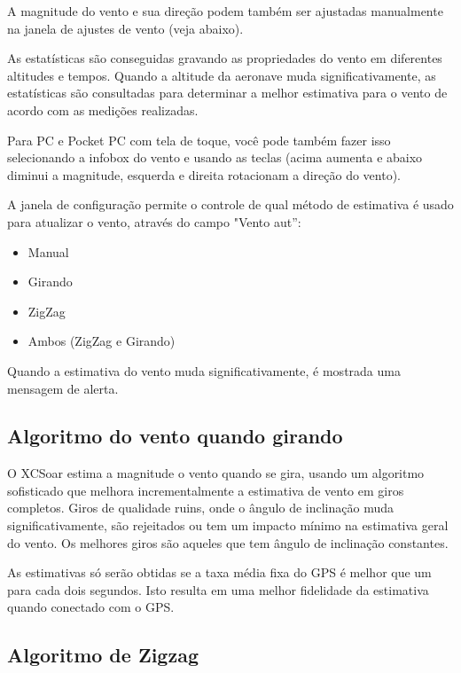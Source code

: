A magnitude do vento e sua direção podem também ser ajustadas manualmente na janela de ajustes de vento (veja abaixo).

As estatísticas são conseguidas gravando as propriedades do vento em diferentes altitudes e tempos.  Quando a altitude da aeronave muda significativamente, as estatísticas são consultadas para determinar a melhor estimativa para o vento de acordo com as medições realizadas.

Para PC e Pocket PC com tela de toque, você pode também fazer isso selecionando a infobox do vento e usando as teclas (acima aumenta e abaixo diminui a magnitude, esquerda e direita rotacionam a direção do vento).


A janela de configuração  permite o controle de qual método de estimativa é usado para atualizar o vento, através do campo "Vento aut”:
\begin{itemize}
\item Manual
\item Girando
\item ZigZag
\item Ambos (ZigZag e Girando)
\end{itemize}

Quando a estimativa do vento muda significativamente, é mostrada uma mensagem de alerta.
 

\subsection*{Algoritmo do vento quando girando}

O XCSoar estima a magnitude o vento quando se gira, usando um algoritmo sofisticado que melhora incrementalmente a estimativa de vento em giros completos.  Giros de qualidade ruins, onde o ângulo de inclinação muda significativamente, são rejeitados ou tem um impacto mínimo na estimativa geral do vento. Os melhores giros são aqueles que tem ângulo de inclinação constantes.

As estimativas só serão obtidas se a taxa média fixa do GPS é melhor que um para cada dois segundos.  Isto resulta em uma melhor fidelidade da estimativa quando conectado com o GPS.



\subsection*{Algoritmo de Zigzag}

